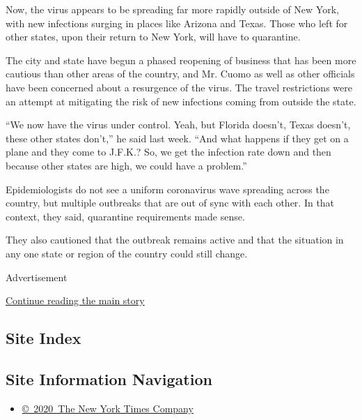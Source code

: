 Now, the virus appears to be spreading far more rapidly outside of New
York, with new infections surging in places like Arizona and Texas.
Those who left for other states, upon their return to New York, will
have to quarantine.

The city and state have begun a phased reopening of business that has
been more cautious than other areas of the country, and Mr. Cuomo as
well as other officials have been concerned about a resurgence of the
virus. The travel restrictions were an attempt at mitigating the risk of
new infections coming from outside the state.

``We now have the virus under control. Yeah, but Florida doesn't, Texas
doesn't, these other states don't,'' he said last week. ``And what
happens if they get on a plane and they come to J.F.K.? So, we get the
infection rate down and then because other states are high, we could
have a problem.''

Epidemiologists do not see a uniform coronavirus wave spreading across
the country, but multiple outbreaks that are out of sync with each
other. In that context, they said, quarantine requirements made sense.

They also cautioned that the outbreak remains active and that the
situation in any one state or region of the country could still change.

Advertisement

\protect\hyperlink{after-bottom}{Continue reading the main story}

\hypertarget{site-index}{%
\subsection{Site Index}\label{site-index}}

\hypertarget{site-information-navigation}{%
\subsection{Site Information
Navigation}\label{site-information-navigation}}

\begin{itemize}
\tightlist
\item
  \href{https://help.nytimes.com/hc/en-us/articles/115014792127-Copyright-notice}{©~2020~The
  New York Times Company}
\end{itemize}

